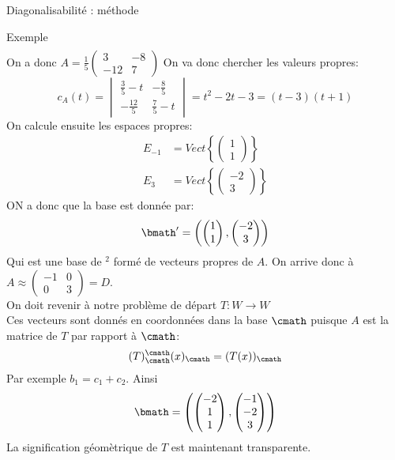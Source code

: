 \begin{parag}{Diagonalisabilité : méthode}
\begin{subparag}{Exemple}
\begin{align*}
        \end{align*}
        On a donc $A = \frac{1}{5}\begin{pmatrix}
            3 & -8 \\ -12 & 7
        \end{pmatrix}$
        On va donc chercher les valeurs propres:
        \[c_A(t) = \begin{vmatrix}
            \frac{3}{5}-t & -\frac{8}{5}\\
            -\frac{12}{5} & \frac{7}{5} - t
        \end{vmatrix} = t^2 -2t -3 = (t-3)(t+1)\]
        On calcule ensuite les espaces propres:
        \begin{align*}
            E_{-1} &= Vect\left\{\begin{pmatrix}
                1 \\ 1
            \end{pmatrix}\right\}\\
            E_3 &= Vect\left\{\begin{pmatrix}
                -2 \\ 3
            \end{pmatrix}\right\}
        \end{align*}
        ON a donc que la base est donnée par:
        \[\bmath' = \left(\begin{pmatrix}
            1 \\ 1
        \end{pmatrix}, \begin{pmatrix}
            -2 \\ 3
        \end{pmatrix}\right)\]
        Qui est une base de \R$^2$ formé de vecteurs propres de $A$.
        On arrive donc à $A \approx \begin{pmatrix}
            -1 & 0 \\ 0 & 3
        \end{pmatrix} = D$.\\
        On doit revenir à notre problème de départ $T : W \to W$
        \\
        Ces vecteurs sont donnés en coordonnées dans la base $\cmath$ puisque $A$ est la matrice de $T$ par rapport à $\cmath$:
        \[(T)_\cmath^\cmath (x)_\cmath = (T(x))_\cmath\]
        Par exemple $b_1 = c_1 + c_2$. Ainsi
        \[\bmath = \left(\begin{pmatrix}
            -2 \\ 1 \\ 1
        \end{pmatrix}, \begin{pmatrix}
            -1 \\-2 \\ 3
        \end{pmatrix}\right)\]
        La signification géomètrique de $T$ est maintenant transparente.
    \end{subparag}
\end{parag}


